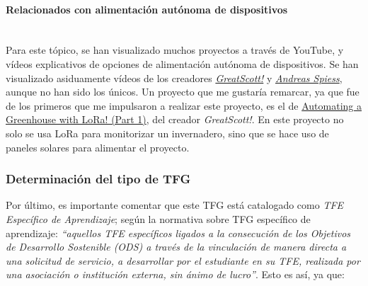 \documentclass[12pt]{article}
\newcommand{\subsubsubsection}[1]{\paragraph{#1}\mbox{}\\}
\begin{document}
	\subsubsubsection{Relacionados con alimentación autónoma de dispositivos}
	
	\noindent Para este tópico, se han visualizado muchos proyectos a través de YouTube, y vídeos explicativos de opciones de alimentación autónoma de dispositivos. 
	Se han visualizado asiduamente vídeos de los creadores \href{https://www.youtube.com/channel/UC6mIxFTvXkWQVEHPsEdflzQ}{\textit{GreatScott!}} y \href{https://www.youtube.com/channel/UCu7_D0o48KbfhpEohoP7YSQ}{\textit{Andreas Spiess}}, aunque no han sido los únicos. Un proyecto que me gustaría remarcar, ya que fue de los primeros que me impulsaron a realizar este proyecto, es el de \href{https://www.youtube.com/watch?v=2YJHcGQnpAk}{Automating a Greenhouse with LoRa! (Part 1)}, del creador \textit{GreatScott!}. En este proyecto no solo se usa LoRa para monitorizar un invernadero, sino que se hace uso de paneles solares para alimentar el proyecto. 
	
	\subsubsection{Determinación del tipo de TFG}
	
	\noindent Por último, es importante comentar que este TFG está catalogado como \textit{TFE Específico de Aprendizaje}; según la normativa sobre TFG específico de aprendizaje: \textit{``aquellos TFE específicos ligados a la consecución de los Objetivos de Desarrollo Sostenible (ODS) a través de la vinculación de manera directa a una solicitud de servicio, a desarrollar por el estudiante en su TFE, realizada por una asociación o institución externa, sin ánimo de lucro''}. Esto es así, ya que:
	
\end{document}
